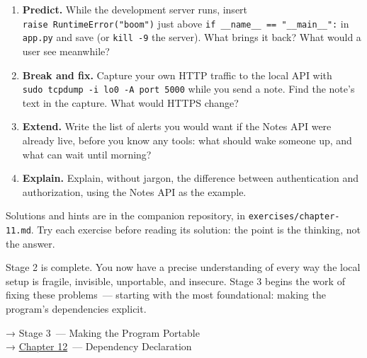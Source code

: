 \begin{enumerate}
\def\labelenumi{\arabic{enumi}.}
\tightlist
\item
  \textbf{Predict.} While the development server runs, insert \texttt{raise\ RuntimeError("boom")} just above \texttt{if\ \_}\allowbreak{}\texttt{\_}\allowbreak{}\texttt{name\_}\allowbreak{}\texttt{\_}\allowbreak{}\texttt{\ =}\allowbreak{}\texttt{=}\allowbreak{}\texttt{\ "\_}\allowbreak{}\texttt{\_}\allowbreak{}\texttt{main\_}\allowbreak{}\texttt{\_}\allowbreak{}\texttt{":} in \texttt{app.py} and save (or \texttt{kill\ -9} the server). What brings it back? What would a user see meanwhile?
\item
  \textbf{Break and fix.} Capture your own HTTP traffic to the local API with \texttt{sudo\ tcpdump\ -}\allowbreak{}\texttt{i\ lo0\ -}\allowbreak{}\texttt{A\ port\ 5000} while you send a note. Find the note's text in the capture. What would HTTPS change?
\item
  \textbf{Extend.} Write the list of alerts you would want if the Notes API were already live, before you know any tools: what should wake someone up, and what can wait until morning?
\item
  \textbf{Explain.} Explain, without jargon, the difference between authentication and authorization, using the Notes API as the example.
\end{enumerate}

\noindent{}Solutions and hints are in the companion repository, in \texttt{exercises/}\allowbreak{}\texttt{chapter-11.md}. Try each exercise before reading its solution: the point is the thinking, not the answer.

\label{11-reliability-security-gaps:whats-next}

Stage 2 is complete. You now have a precise understanding of every way the local setup is fragile, invisible, unportable, and insecure. Stage 3 begins the work of fixing these problems~--- starting with the most foundational: making the program's dependencies explicit.

\noindent{}→ Stage 3~--- Making the Program Portable\\
→ \hyperref[ch:12-dependency-declaration]{Chapter 12}~--- Dependency Declaration
